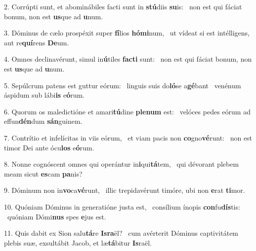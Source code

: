 2. Corrúpti sunt, et abominábiles facti sunt in \textbf{stú}diis \textbf{su}is: \ast\  non est qui fáciat bonum, non est \textbf{us}que ad \textbf{u}num.\

3. Dóminus de cælo prospéxit super \textbf{fí}lios \textbf{hó}\textbf{mi}num, \ast\  ut vídeat si est intélligens, aut re\textbf{quí}rens \textbf{De}um.\

4. Omnes declinavérunt, simul in\textbf{ú}tiles \textbf{fac}\textbf{ti} sunt: \ast\  non est qui fáciat bonum, non est \textbf{us}que ad \textbf{u}num.\

5. Sepúlcrum patens est guttur eórum: \dag\  linguis suis do\textbf{ló}se a\textbf{gé}bant \ast\  venénum áspidum sub lábi\textbf{is} e\textbf{ó}rum.\

6. Quorum os maledictióne et amari\textbf{tú}dine \textbf{ple}\textbf{num} est: \ast\  velóces pedes eórum ad effun\textbf{dén}dum \textbf{sán}guinem.\

7. Contrítio et infelícitas in viis eórum, \dag\  et viam pacis non \textbf{co}gno\textbf{vé}runt: \ast\  non est timor Dei ante ócu\textbf{los} e\textbf{ó}rum.\

8. Nonne cognóscent omnes qui operántur in\textbf{i}qui\textbf{tá}tem, \ast\  qui dévorant plebem meam sicut \textbf{es}cam \textbf{pa}nis?\

9. Dóminum non in\textbf{vo}ca\textbf{vé}runt, \ast\  illic trepidavérunt timóre, ubi non \textbf{e}rat \textbf{ti}mor.\

10. Quóniam Dóminus in generatióne justa est, \dag\  consílium ínopis \textbf{con}fu\textbf{dís}tis: \ast\  quóniam Dómi\textbf{nus} spes \textbf{e}jus est.\

11. Quis dabit ex Sion salu\textbf{tá}re \textbf{Is}\textbf{ra}ël? \ast\  cum avérterit Dóminus captivitátem plebis suæ, exsultábit Jacob, et læ\textbf{tá}bitur \textbf{Is}raël.\


